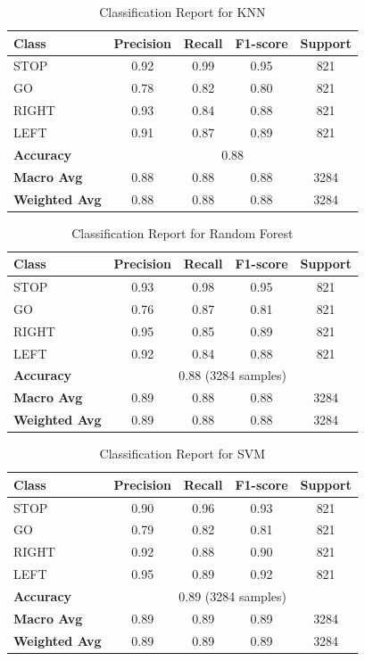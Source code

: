 \begin{table}[h]
\centering
\caption{Classification Report for KNN}
\begin{tabular}{lcccc}
\hline
\textbf{Class} & \textbf{Precision} & \textbf{Recall} & \textbf{F1-score} & \textbf{Support} \\
\hline
STOP  & 0.92 & 0.99 & 0.95 & 821 \\
GO    & 0.78 & 0.82 & 0.80 & 821 \\
RIGHT & 0.93 & 0.84 & 0.88 & 821 \\
LEFT  & 0.91 & 0.87 & 0.89 & 821 \\
\hline
\textbf{Accuracy} & \multicolumn{4}{c}{0.88} \\
\textbf{Macro Avg} & 0.88 & 0.88 & 0.88 & 3284 \\
\textbf{Weighted Avg} & 0.88 & 0.88 & 0.88 & 3284 \\
\hline
\end{tabular}
\label{tab:knn_classification_report}
\end{table}


\begin{table}[h]
\centering
\caption{Classification Report for Random Forest}
\begin{tabular}{lcccc}
\hline
\textbf{Class} & \textbf{Precision} & \textbf{Recall} & \textbf{F1-score} & \textbf{Support} \\
\hline
STOP  & 0.93 & 0.98 & 0.95 & 821 \\
GO    & 0.76 & 0.87 & 0.81 & 821 \\
RIGHT & 0.95 & 0.85 & 0.89 & 821 \\
LEFT  & 0.92 & 0.84 & 0.88 & 821 \\
\hline
\textbf{Accuracy} & \multicolumn{4}{c}{0.88 (3284 samples)} \\
\textbf{Macro Avg} & 0.89 & 0.88 & 0.88 & 3284 \\
\textbf{Weighted Avg} & 0.89 & 0.88 & 0.88 & 3284 \\
\hline
\end{tabular}
\label{tab:random_forest_classification_report}
\end{table}


\begin{table}[h]
\centering
\caption{Classification Report for SVM}
\begin{tabular}{lcccc}
\hline
\textbf{Class} & \textbf{Precision} & \textbf{Recall} & \textbf{F1-score} & \textbf{Support} \\
\hline
STOP  & 0.90 & 0.96 & 0.93 & 821 \\
GO    & 0.79 & 0.82 & 0.81 & 821 \\
RIGHT & 0.92 & 0.88 & 0.90 & 821 \\
LEFT  & 0.95 & 0.89 & 0.92 & 821 \\
\hline
\textbf{Accuracy} & \multicolumn{4}{c}{0.89 (3284 samples)} \\
\textbf{Macro Avg} & 0.89 & 0.89 & 0.89 & 3284 \\
\textbf{Weighted Avg} & 0.89 & 0.89 & 0.89 & 3284 \\
\hline
\end{tabular}
\label{tab:svm_classification_report}
\end{table}



